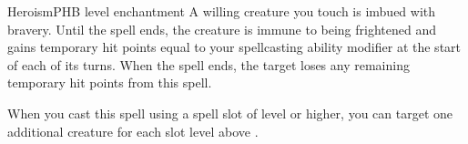 \begin{spell}{Heroism}{PHB}{ level enchantment}
{
}
A willing creature you touch is imbued with bravery.
Until the spell ends, the creature is immune to being
frightened and gains temporary hit points equal to
your spellcasting ability modifier at the start of each
of its turns. When the spell ends, the target loses any
remaining temporary hit points from this spell.

 When you cast this spell using
a spell slot of  level or higher, you can target one
additional creature for each slot level above .
\end{spell}